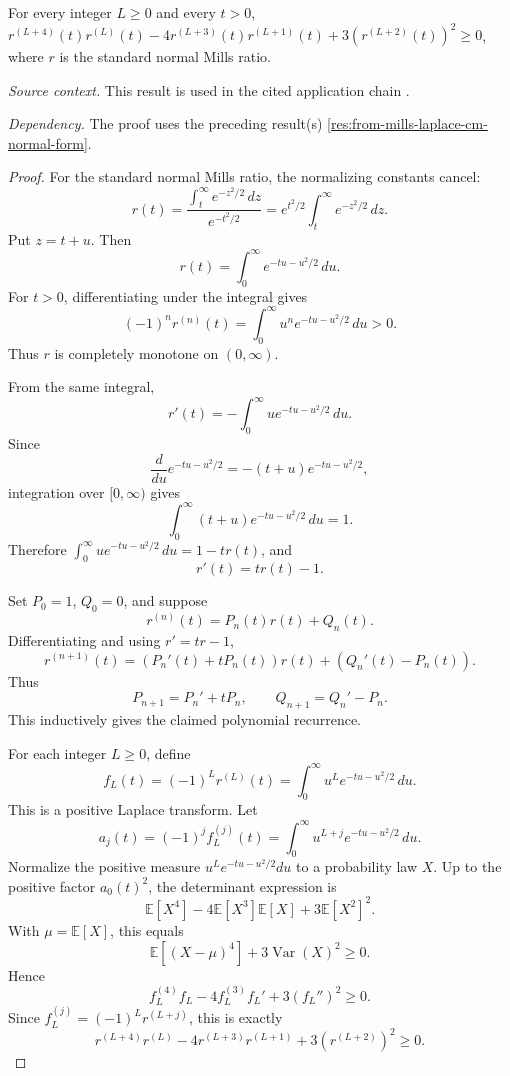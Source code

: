 \begin{theorem}
\label{res:from-mills-derivative-determinant-all-l}
For every integer \(L\ge0\) and every \(t>0\), \(r^{(L+4)}(t)r^{(L)}(t)-4r^{(L+3)}(t)r^{(L+1)}(t)+3(r^{(L+2)}(t))^2\ge0\), where \(r\) is the standard normal Mills ratio.

\emph{Source context.} This result is used in the cited application chain \cite{app-app-0042-source,from-mills}.

\emph{Dependency.} The proof uses the preceding result(s) \ref{res:from-mills-laplace-cm-normal-form}.
\end{theorem}
\begin{proof}
For the standard normal Mills ratio, the normalizing constants cancel:
\[
r(t)=\frac{\int_t^\infty e^{-z^2/2}\,dz}{e^{-t^2/2}}
=e^{t^2/2}\int_t^\infty e^{-z^2/2}\,dz.
\]
Put \(z=t+u\). Then
\[
r(t)=\int_0^\infty e^{-tu-u^2/2}\,du.
\]
For \(t>0\), differentiating under the integral gives
\[
(-1)^n r^{(n)}(t)=\int_0^\infty u^n e^{-tu-u^2/2}\,du>0.
\]
Thus \(r\) is completely monotone on \((0,\infty)\).

From the same integral,
\[
r'(t)=-\int_0^\infty u e^{-tu-u^2/2}\,du.
\]
Since
\[
\frac{d}{du}e^{-tu-u^2/2}=-(t+u)e^{-tu-u^2/2},
\]
integration over \([0,\infty)\) gives
\[
\int_0^\infty (t+u)e^{-tu-u^2/2}\,du=1.
\]
Therefore \(\int_0^\infty u e^{-tu-u^2/2}\,du=1-tr(t)\), and
\[
r'(t)=tr(t)-1.
\]

Set \(P_0=1\), \(Q_0=0\), and suppose
\[
r^{(n)}(t)=P_n(t)r(t)+Q_n(t).
\]
Differentiating and using \(r'=tr-1\),
\[
r^{(n+1)}(t)=(P_n'(t)+tP_n(t))r(t)+(Q_n'(t)-P_n(t)).
\]
Thus
\[
P_{n+1}=P_n'+tP_n,\qquad Q_{n+1}=Q_n'-P_n.
\]
This inductively gives the claimed polynomial recurrence.

For each integer \(L\ge0\), define
\[
f_L(t)=(-1)^L r^{(L)}(t)=\int_0^\infty u^L e^{-tu-u^2/2}\,du.
\]
This is a positive Laplace transform. Let
\[
a_j(t)=(-1)^j f_L^{(j)}(t)=\int_0^\infty u^{L+j}e^{-tu-u^2/2}\,du.
\]
Normalize the positive measure \(u^L e^{-tu-u^2/2}du\) to a probability law \(X\). Up to the positive factor \(a_0(t)^2\), the determinant expression is
\[
\mathbb E[X^4]-4\mathbb E[X^3]\mathbb E[X]+3\mathbb E[X^2]^2.
\]
With \(\mu=\mathbb E[X]\), this equals
\[
\mathbb E[(X-\mu)^4]+3\operatorname{Var}(X)^2\ge0.
\]
Hence
\[
f_L^{(4)}f_L-4f_L^{(3)}f_L'+3(f_L'')^2\ge0.
\]
Since \(f_L^{(j)}=(-1)^L r^{(L+j)}\), this is exactly
\[
r^{(L+4)}r^{(L)}-4r^{(L+3)}r^{(L+1)}+3(r^{(L+2)})^2\ge0.
\]
\end{proof}

